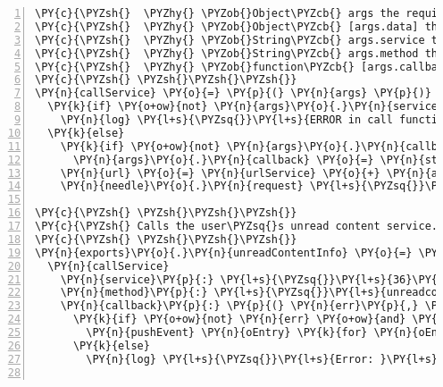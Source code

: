 \begin{Verbatim}[fontsize=\scriptsize,commandchars=\\\{\},numbers=left,firstnumber=1,stepnumber=1]
\PY{c}{\PYZsh{}  \PYZhy{} \PYZob{}Object\PYZcb{} args the required function arguments object}
\PY{c}{\PYZsh{}  \PYZhy{} \PYZob{}Object\PYZcb{} [args.data] the data to be posted}
\PY{c}{\PYZsh{}  \PYZhy{} \PYZob{}String\PYZcb{} args.service the required service identifier to be appended to the url}
\PY{c}{\PYZsh{}  \PYZhy{} \PYZob{}String\PYZcb{} args.method the required method identifier to be appended to the url}
\PY{c}{\PYZsh{}  \PYZhy{} \PYZob{}function\PYZcb{} [args.callback] the function to receive the request answer}
\PY{c}{\PYZsh{} \PYZsh{}\PYZsh{}\PYZsh{}}
\PY{n}{callService} \PY{o}{=} \PY{p}{(} \PY{n}{args} \PY{p}{)} \PY{o}{\PYZhy{}}\PY{o}{\PYZgt{}}
  \PY{k}{if} \PY{o+ow}{not} \PY{n}{args}\PY{o}{.}\PY{n}{service} \PY{o+ow}{or} \PY{o+ow}{not} \PY{n}{args}\PY{o}{.}\PY{n}{method}
    \PY{n}{log} \PY{l+s}{\PYZsq{}}\PY{l+s}{ERROR in call function: Missing arguments!}\PY{l+s}{\PYZsq{}}
  \PY{k}{else}
    \PY{k}{if} \PY{o+ow}{not} \PY{n}{args}\PY{o}{.}\PY{n}{callback}
      \PY{n}{args}\PY{o}{.}\PY{n}{callback} \PY{o}{=} \PY{n}{standardCallback} \PY{l+s}{\PYZsq{}}\PY{l+s}{call}\PY{l+s}{\PYZsq{}}
    \PY{n}{url} \PY{o}{=} \PY{n}{urlService} \PY{o}{+} \PY{n}{args}\PY{o}{.}\PY{n}{service} \PY{o}{+} \PY{l+s}{\PYZsq{}}\PY{l+s}{/}\PY{l+s}{\PYZsq{}} \PY{o}{+} \PY{n}{args}\PY{o}{.}\PY{n}{method}
    \PY{n}{needle}\PY{o}{.}\PY{n}{request} \PY{l+s}{\PYZsq{}}\PY{l+s}{post}\PY{l+s}{\PYZsq{}}\PY{p}{,} \PY{n}{url}\PY{p}{,} \PY{n}{args}\PY{o}{.}\PY{n}{data}\PY{p}{,} \PY{n}{credentials}\PY{p}{,} \PY{n}{args}\PY{o}{.}\PY{n}{callback}

\PY{c}{\PYZsh{} \PYZsh{}\PYZsh{}\PYZsh{}}
\PY{c}{\PYZsh{} Calls the user\PYZsq{}s unread content service.}
\PY{c}{\PYZsh{} \PYZsh{}\PYZsh{}\PYZsh{}}
\PY{n}{exports}\PY{o}{.}\PY{n}{unreadContentInfo} \PY{o}{=} \PY{p}{(}\PY{p}{)} \PY{o}{\PYZhy{}}\PY{o}{\PYZgt{}}
  \PY{n}{callService}
    \PY{n}{service}\PY{p}{:} \PY{l+s}{\PYZsq{}}\PY{l+s}{36}\PY{l+s}{\PYZsq{}}
    \PY{n}{method}\PY{p}{:} \PY{l+s}{\PYZsq{}}\PY{l+s}{unreadcontent}\PY{l+s}{\PYZsq{}}
    \PY{n}{callback}\PY{p}{:} \PY{p}{(} \PY{n}{err}\PY{p}{,} \PY{n}{resp}\PY{p}{,} \PY{n}{body} \PY{p}{)} \PY{o}{\PYZhy{}}\PY{o}{\PYZgt{}}
      \PY{k}{if} \PY{o+ow}{not} \PY{n}{err} \PY{o+ow}{and} \PY{n}{resp}\PY{o}{.}\PY{n}{statusCode} \PY{o+ow}{is} \PY{l+m+mi}{200}
        \PY{n}{pushEvent} \PY{n}{oEntry} \PY{k}{for} \PY{n}{oEntry} \PY{o+ow}{in} \PY{n}{body}
      \PY{k}{else}
        \PY{n}{log} \PY{l+s}{\PYZsq{}}\PY{l+s}{Error: }\PY{l+s}{\PYZsq{}} \PY{o}{+} \PY{n}{body}\PY{o}{.}\PY{n}{error}\PY{o}{.}\PY{n}{message}


\end{Verbatim}
